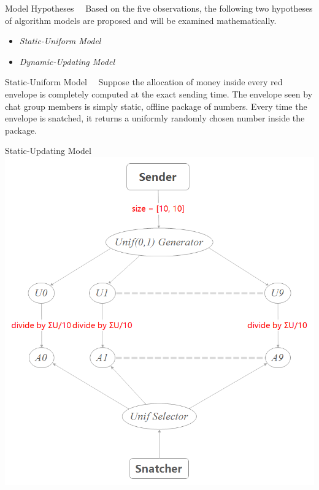 \documentclass[12pt]{beamer}
\renewcommand{\[}{\begin{equation*} \begin{aligned}} %
\renewcommand{\]}{\end{aligned} \end{equation*}}
\begin{document}
\begin{frame}{Model Hypotheses}
	\ \ Based on the five observations, the following two hypotheses of algorithm models are proposed and will be examined mathematically.
	\begin{itemize}
		\item \textit{Static-Uniform Model}
		\item \textit{Dynamic-Updating Model}
	\end{itemize}
\end{frame}

\begin{frame}{Static-Uniform Model}
	\ \ Suppose the allocation of money inside every red envelope is completely computed at the exact sending time. The envelope seen by chat group members is simply static, offline package of numbers. Every time the envelope is snatched, it returns a uniformly randomly chosen number inside the package.
\end{frame}

\begin{frame}{Static-Updating Model}
	\centering
	\includegraphics[scale=0.25]{model1.png}
\end{frame}
\end{document}
